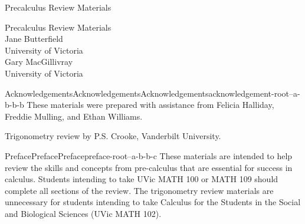 \documentclass[oneside,10pt,]{book}
\newcommand{\titlepagefont}{\relax}
\begin{document}
\raggedbottom
\frontmatter
\thispagestyle{empty}
{\titlepagefont\centering
\vspace*{0.28\textheight}
{\Huge Precalculus Review Materials}\\}
\clearpage
\thispagestyle{empty}
{\titlepagefont\centering
\vspace*{0.14\textheight}
{\Huge Precalculus Review Materials}\\[3\baselineskip]
{\Large Jane Butterfield}\\[0.5\baselineskip]
{\Large University of Victoria}\\[3\baselineskip]
{\Large Gary MacGillivray}\\[0.5\baselineskip]
{\Large University of Victoria}\\}
\clearpage
\thispagestyle{empty}
\null\clearpage
%
%
\typeout{************************************************}
\typeout{************************************************}
%
\begin{acknowledgement}{Acknowledgements}{Acknowledgements}{}{Acknowledgements}{}{}{acknowledgement-root--a-b-b-b}
These materials were prepared with assistance from Felicia Halliday, Freddie Mulling, and Ethan Williams.%
\par
Trigonometry review by P.S. Crooke, Vanderbilt University.%
\end{acknowledgement}
%
%
\typeout{************************************************}
\typeout{************************************************}
%
\begin{preface}{Preface}{Preface}{}{Preface}{}{}{preface-root--a-b-b-c}
These materials are intended to help review the skills and concepts from pre-calculus that are essential for success in calculus.  Students intending to take UVic MATH 100 or MATH 109 should complete all sections of the review.  The trigonometry review materials are unnecessary for students intending to take Calculus for the Students in the Social and Biological Sciences (UVic MATH 102).%
\end{preface}
\end{document}

